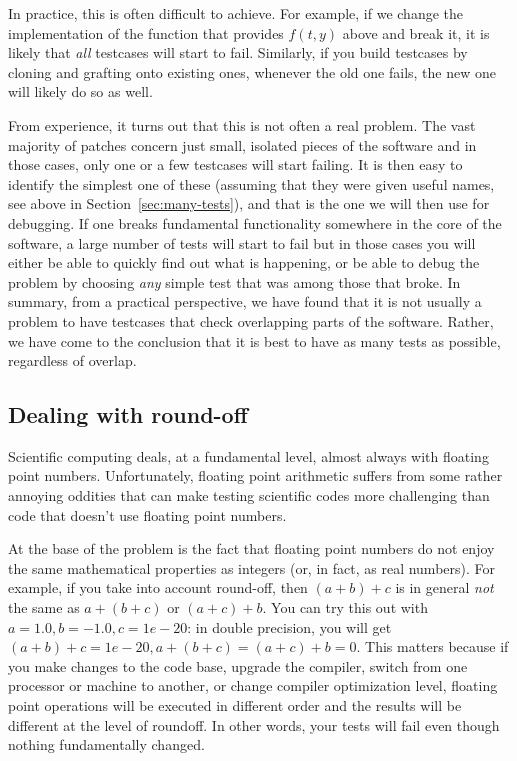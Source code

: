 \documentclass{article}
\begin{document}
In practice, this is often difficult to achieve. For example, if we change the
implementation of the function that provides $f(t,y)$ above and break it, it
is likely that \textit{all} testcases will start to fail. Similarly, if you
build testcases by cloning and grafting onto existing ones, whenever the old
one fails, the new one will likely do so as well.

From experience, it turns out that this is not often a real problem. The vast
majority of patches concern just small, isolated pieces of the software and in
those cases, only one or a few testcases will start failing. It is then easy
to identify the simplest one of these (assuming that they were given useful
names, see above in Section~\ref{sec:many-tests}), and that is the one we
will then use for debugging. If one breaks fundamental functionality somewhere
in the core of the software, a large number of tests will start to fail
but in those cases you will either be able to quickly find out what is
happening, or be able to debug the problem by choosing \textit{any} simple
test that was among those that broke. In summary, from a practical
perspective, we have found that it is not usually a problem to have testcases
that check overlapping parts of the software. Rather, we have come to the
conclusion that it is best to have as many tests as possible, regardless of overlap.


\subsection{Dealing with round-off}

Scientific computing deals, at a fundamental level, almost always with
floating point numbers. Unfortunately, floating point arithmetic suffers from
some rather annoying oddities that can make testing scientific codes more
challenging than code that doesn't use floating point numbers.

At the base of the problem is the fact that floating point numbers do not
enjoy the same mathematical properties as integers (or, in fact, as real
numbers). For example, if you take into account round-off, then $(a+b)+c$ is in
general \textit{not} the same as $a+(b+c)$ or $(a+c)+b$. You can try this out
with $a=1.0, b=-1.0, c=1e-20$: in double precision, you will get
$(a+b)+c=1e-20, a+(b+c)=(a+c)+b=0$. This matters because if you make changes
to the code base, upgrade the compiler, switch from one processor or machine
to another, or change compiler optimization level, floating point operations
will be executed in different order and the results will be different at the
level of roundoff. In other words, your tests will fail even though
nothing fundamentally changed.
\end{document}

